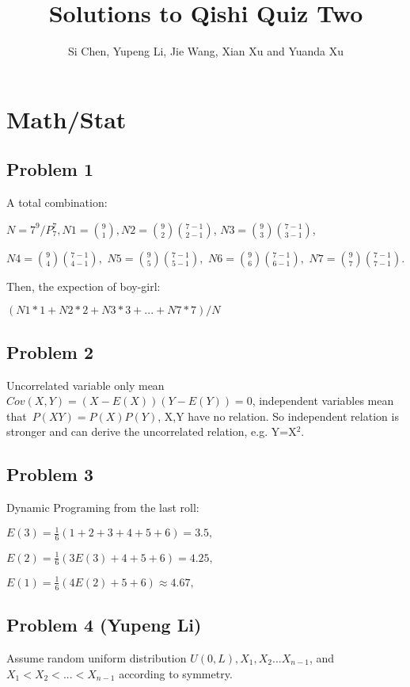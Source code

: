 \documentclass[10pt]{article}
\begin{document}
\title{Solutions to Qishi Quiz Two}
\author{Si Chen, Yupeng Li, Jie Wang, Xian Xu and Yuanda Xu}
\maketitle

\section{Math/Stat}

\subsection*{Problem 1~}
A total combination:

$N =7^{9}/P_{7}^{7} ,N1 =\binom{9}{1}$$ ,N2 =\binom{9}{2}\binom{7 -1}{2 -1}$, $N3 =\binom{9}{3}\binom{7 -1}{3 -1}$,

$N4 =\binom{9}{4}\binom{7 -1}{4 -1} ,$ $N5 =\binom{9}{5}\binom{7 -1}{5 -1} ,$ $N6 =\binom{9}{6}\binom{7 -1}{6 -1} ,$ $N7 =\binom{9}{7}\binom{7 -1}{7 -1}$.

Then, the expection of boy-girl:

$(N1 \ast 1 +N2 \ast 2 +N3 \ast 3 + . . . +N7 \ast 7)/N$

\subsection*{Problem 2~}
Uncorrelated variable only mean $Cov(X ,Y) =(X -E(X))(Y -E(Y)) =0$, independent variables mean that~$P(XY) =P(X)P(Y)$, X,Y have no relation. So independent relation is stronger and can derive the uncorrelated relation, e.g. Y=X{\ensuremath{^{\textrm{2}}}}.

\subsection*{Problem 3~}
Dynamic Programing from the last roll:

$E(3) =\frac{1}{6}(1 +2 +3 +4 +5 +6) =3.5 ,$

$E(2) =\frac{1}{6}(3E(3) +4 +5 +6) =4.25 ,$

$E(1) =\frac{1}{6}(4E(2) +5 +6) \approx 4.67 ,$\begin{equation*}\;
\end{equation*}

\subsection*{Problem 4 (Yupeng Li)}
\qquad Assume random uniform distribution $U(0 ,L) ,X_{1} ,X_{2}...X_{n -1}$, and $X_{1} <X_{2} <... <X_{n -1}$ according to symmetry.
\end{document}
